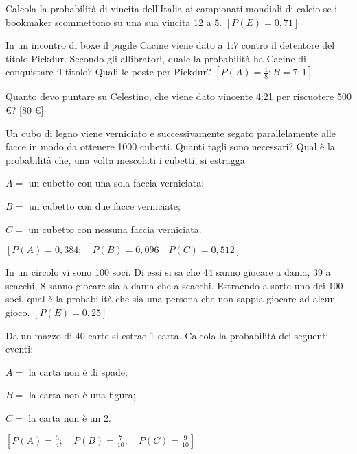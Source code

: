 \begin{esercizio}[\Ast]
 \label{ese:9.40}
Calcola la probabilità di vincita dell'Italia ai campionati mondiali di calcio 
se i bookmaker scommettono su una sua vincita 12 a 5.
\hfill $\left[P(E)=0,71\right]$
\end{esercizio}

\begin{esercizio}[\Ast]
 \label{ese:9.41}
In un incontro di boxe il pugile Cacine viene dato a 1:7 contro il detentore del 
titolo Pickdur.
Secondo gli allibratori, quale la probabilità ha Cacine di conquistare il 
titolo?
Quali le poste per Pickdur?
\hfill $\left[P(A)=\frac 1 8;B=7:1\right]$
\end{esercizio}

\begin{esercizio}[\Ast]
 \label{ese:9.42}
Quanto devo puntare su Celestino, che viene dato vincente 4:21 per riscuotere 
500 €?
\hfill [80 €]
\end{esercizio}

\begin{esercizio}[\Ast]
 \label{ese:9.43}
Un cubo di legno viene verniciato e successivamente segato parallelamente alle 
facce in modo da ottenere 1000 cubetti. Quanti tagli sono necessari? Qual è la 
probabilità che, una volta mescolati i cubetti, si estragga
\begin{itemize*}
\item $ A= $ un cubetto con una sola faccia verniciata;
\item $ B= $ un cubetto con due facce verniciate;
\item $ C= $ un cubetto con nessuna faccia verniciata.
\end{itemize*}
\hfill $\left[P(A)=0,384; \quad P(B)=0,096 \quad P(C)=0,512\right]$
\end{esercizio}

\begin{esercizio}[\Ast]
 \label{ese:9.44}
In un circolo vi sono 100 soci. Di essi si sa che 44 sanno giocare a dama, 39 a 
scacchi, 8 sanno giocare sia a dama che a scacchi. Estraendo a sorte uno dei 100 
soci, qual è la probabilità che sia una persona che non sappia giocare ad alcun 
gioco.
\hfill $\left[P(E)=0,25\right]$
\end{esercizio}

\begin{esercizio}[\Ast]
 \label{ese:9.45}
Da un mazzo di 40 carte si estrae 1 carta. Calcola la probabilità dei seguenti 
eventi:
\begin{itemize*}
\item $ A= $ la carta non è di spade;
\item $ B= $ la carta non è una figura;
\item $ C= $ la carta non è un 2.
\end{itemize*}
\hfill $\left[P(A)=\frac 3 4; \quad P(B)=\frac 7{10}; \quad 
P(C)=\frac 9{10}\right]$
\end{esercizio}

